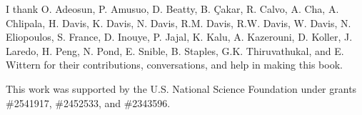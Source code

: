 





I thank O. Adeosun, P. Amusuo, D. Beatty, B. Çakar, R. Calvo, A. Cha, A. Chlipala, H. Davis, K. Davis, N. Davis, R.M. Davis, R.W. Davis, W. Davis, N. Eliopoulos, S. France, D. Inouye, P. Jajal, K. Kalu, A. Kazerouni, D. Koller, J. Laredo, H. Peng, N. Pond, E. Snible, B. Staples, G.K. Thiruvathukal, and E. Wittern for their contributions, conversations, and help in making this book.

This work was supported by the U.S. National Science Foundation under grants \#2541917, \#2452533, and \#2343596.

